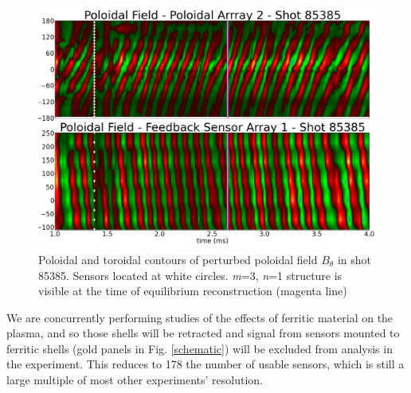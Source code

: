 \documentclass[aps,preprint,showpacs,superscriptaddress,groupedaddress]{revtex4}  %
\begin{document}
\begin{figure}[htb]
\centering
\includegraphics[scale=.475]{../Plots/stripey_plot_85385_new.png}\caption{Poloidal and toroidal contours of perturbed poloidal field $B_\theta$ in shot 85385.  Sensors located at white circles.  \textit{m}=3, \textit{n}=1 structure is visible at the time of equilibrium reconstruction (magenta line)}
\label{Stripey_85385}
\end{figure}
	We are concurrently performing studies of the effects of ferritic material on the plasma, and so those shells will be retracted and signal from sensors mounted to ferritic shells (gold panels in Fig. \ref{schematic})  will be excluded from analysis in the experiment.  This reduces to 178 the number of usable sensors, which is still a large multiple of most other experiments' resolution.
\end{document}
